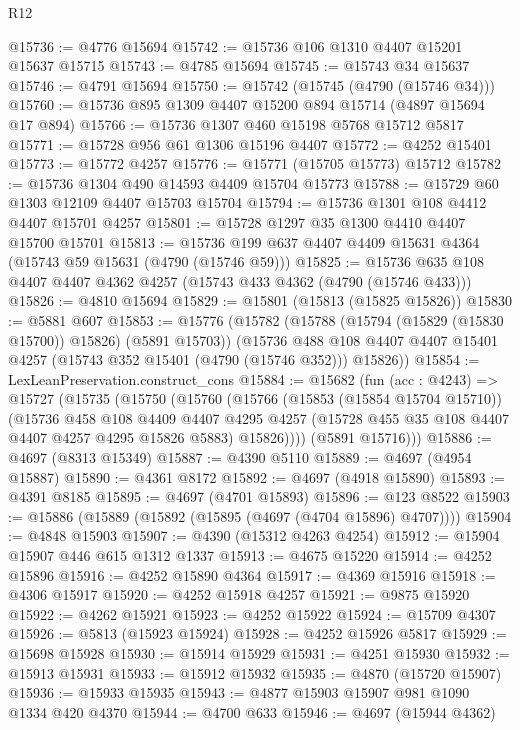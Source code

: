 \begin{lexlean}{R12}
\begin{coremodule}
@15736 := @4776 @15694
@15742 := @15736 @106 @1310 @4407 @15201 @15637 @15715
@15743 := @4785 @15694
@15745 := @15743 @34 @15637
@15746 := @4791 @15694
@15750 := @15742 (@15745 (@4790 (@15746 @34)))
@15760 := @15736 @895 @1309 @4407 @15200 @894 @15714 (@4897 @15694 @17 @894)
@15766 := @15736 @1307 @460 @15198 @5768 @15712 @5817
@15771 := @15728 @956 @61 @1306 @15196 @4407
@15772 := @4252 @15401
@15773 := @15772 @4257
@15776 := @15771 (@15705 @15773) @15712
@15782 := @15736 @1304 @490 @14593 @4409 @15704 @15773
@15788 := @15729 @60 @1303 @12109 @4407 @15703 @15704
@15794 := @15736 @1301 @108 @4412 @4407 @15701 @4257
@15801 := @15728 @1297 @35 @1300 @4410 @4407 @15700 @15701
@15813 := @15736 @199 @637 @4407 @4409 @15631 @4364 (@15743 @59 @15631 (@4790 (@15746 @59)))
@15825 := @15736 @635 @108 @4407 @4407 @4362 @4257 (@15743 @433 @4362 (@4790 (@15746 @433)))
@15826 := @4810 @15694
@15829 := @15801 (@15813 (@15825 @15826))
@15830 := @5881 @607
@15853 := @15776
    (@15782
      (@15788 (@15794 (@15829 (@15830 @15700)) @15826) (@5891 @15703))
      (@15736 @488 @108 @4407 @4407 @15401 @4257 (@15743 @352 @15401 (@4790 (@15746 @352))) @15826))
@15854 := LexLeanPreservation.construct_cons
@15884 := @15682
    (fun (acc : @4243) =>
    @15727
      (@15735
        (@15750
          (@15760
            (@15766
              (@15853 (@15854 @15704 @15710))
              (@15736
                @458
                @108
                @4409
                @4407
                @4295
                @4257
                (@15728 @455 @35 @108 @4407 @4407 @4257 @4295 @15826 @5883)
                @15826))))
        (@5891 @15716)))
@15886 := @4697 (@8313 @15349)
@15887 := @4390 @5110
@15889 := @4697 (@4954 @15887)
@15890 := @4361 @8172
@15892 := @4697 (@4918 @15890)
@15893 := @4391 @8185
@15895 := @4697 (@4701 @15893)
@15896 := @123 @8522
@15903 := @15886 (@15889 (@15892 (@15895 (@4697 (@4704 @15896) @4707))))
@15904 := @4848 @15903
@15907 := @4390 (@15312 @4263 @4254)
@15912 := @15904 @15907 @446 @615 @1312 @1337
@15913 := @4675 @15220
@15914 := @4252 @15896
@15916 := @4252 @15890 @4364
@15917 := @4369 @15916
@15918 := @4306 @15917
@15920 := @4252 @15918 @4257
@15921 := @9875 @15920
@15922 := @4262 @15921
@15923 := @4252 @15922
@15924 := @15709 @4307
@15926 := @5813 (@15923 @15924)
@15928 := @4252 @15926 @5817
@15929 := @15698 @15928
@15930 := @15914 @15929
@15931 := @4251 @15930
@15932 := @15913 @15931
@15933 := @15912 @15932
@15935 := @4870 (@15720 @15907)
@15936 := @15933 @15935
@15943 := @4877 @15903 @15907 @981 @1090 @1334 @420 @4370
@15944 := @4700 @633
@15946 := @4697 (@15944 @4362)

\end{coremodule}
\end{lexlean}
